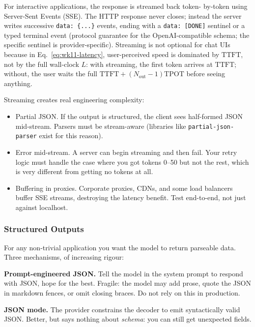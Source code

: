 For interactive applications, the response is streamed back token-
by-token using Server-Sent Events (SSE). The HTTP response never
closes; instead the server writes successive \texttt{data: \{...\}}
events, ending with a \texttt{data: [DONE]} sentinel or a typed
terminal event (protocol guarantee for the OpenAI-compatible
schema; the specific sentinel is provider-specific). Streaming is
not optional for chat UIs because in Eq.~\eqref{eq:wk11-latency},
user-perceived speed is dominated by $\mathrm{TTFT}$, not by the
full wall-clock $L$: with streaming, the first token arrives at
$\mathrm{TTFT}$; without, the user waits the full
$\mathrm{TTFT} + (N_\mathrm{out} - 1)\mathrm{TPOT}$ before seeing
anything.

Streaming creates real engineering complexity:
\begin{itemize}
  \item Partial JSON. If the output is structured, the client
        sees half-formed JSON mid-stream. Parsers must be
        stream-aware (libraries like \texttt{partial-json-parser}
        exist for this reason).
  \item Error mid-stream. A server can begin streaming and then
        fail. Your retry logic must handle the case where you got
        tokens 0--50 but not the rest, which is very different
        from getting no tokens at all.
  \item Buffering in proxies. Corporate proxies, CDNs, and some
        load balancers buffer SSE streams, destroying the latency
        benefit. Test end-to-end, not just against localhost.
\end{itemize}

\subsubsection{Structured Outputs}

For any non-trivial application you want the model to return
parseable data. Three mechanisms, of increasing rigour:

\textbf{Prompt-engineered JSON.} Tell the model in the system
prompt to respond with JSON, hope for the best. Fragile: the
model may add prose, quote the JSON in markdown fences, or omit
closing braces. Do not rely on this in production.

\textbf{JSON mode.} The provider constrains the decoder to emit
syntactically valid JSON. Better, but says nothing about
\emph{schema}: you can still get unexpected fields.


